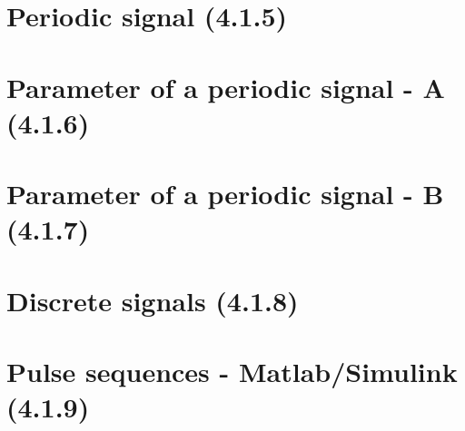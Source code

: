 \documentclass[12pt,paper=A4,english,headings=small,footlines=2.1,footheight=15mm]{scrreprt}
\begin{document}
\section{Periodic signal (4.1.5)}


\section{Parameter of a periodic signal - A (4.1.6)}


\section{Parameter of a periodic signal - B (4.1.7)}


\section{Discrete signals (4.1.8)}


\section{Pulse sequences - Matlab/Simulink (4.1.9)}

\end{document}
